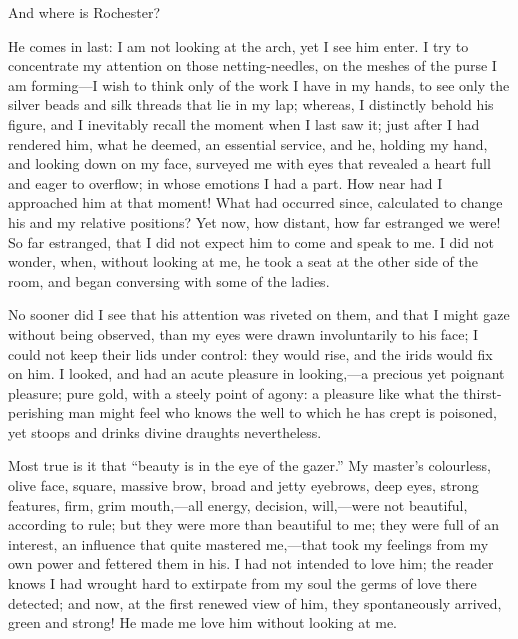 And where is \Mr{} Rochester?

He comes in last: I am not looking at the arch, yet I see him enter. I
try to concentrate my attention on those netting-needles, on the meshes
of the purse I am forming---I wish to think only of the work I have in
my hands, to see only the silver beads and silk threads that lie in my
lap; whereas, I distinctly behold his figure, and I inevitably recall
the moment when I last saw it; just after I had rendered him, what he
deemed, an essential service, and he, holding my hand, and looking down
on my face, surveyed me with eyes that revealed a heart full and eager
to overflow; in whose emotions I had a part. How near had I approached
him at that moment! What had occurred since, calculated to change his
and my relative positions? Yet now, how distant, how far estranged we
were! So far estranged, that I did not expect him to come and speak to
me. I did not wonder, when, without looking at me, he took a seat at
the other side of the room, and began conversing with some of the
ladies.

No sooner did I see that his attention was riveted on them, and that I
might gaze without being observed, than my eyes were drawn involuntarily
to his face; I could not keep their lids under control: they would rise,
and the irids would fix on him. I looked, and had an acute pleasure in
looking,---a precious yet poignant pleasure; pure gold, with a steely
point of agony: a pleasure like what the thirst-perishing man might feel
who knows the well to which he has crept is poisoned, yet stoops and
drinks divine draughts nevertheless.

Most true is it that \enquote{beauty is in the eye of the gazer.} My
master's colourless, olive face, square, massive brow, broad and jetty
eyebrows, deep eyes, strong features, firm, grim mouth,---all energy,
decision, will,---were not beautiful, according to rule; but they were
more than beautiful to me; they were full of an interest, an influence
that quite mastered me,---that took my feelings from my own power and
fettered them in his. I had not intended to love him; the reader knows
I had wrought hard to extirpate from my soul the germs of love there
detected; and now, at the first renewed view of him, they spontaneously
arrived, green and strong! He made me love him without looking at me.


